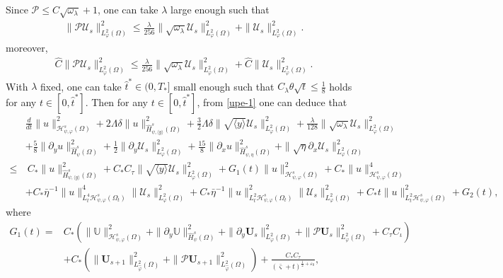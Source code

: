 \documentclass{amsart}
\numberwithin{equation}{section}
\newcommand\y{{{\langle y \rangle}}}
\begin{document}
Since $\mathcal{P}\leq C\sqrt{\omega_{\lambda}}+1$, one can take $\lambda$ large enough such that
\begin{align}\label{pusc}
\|\mathcal{P}\mathcal{U}_{s}\|_{L_{\varphi}^{2}(\Omega)}^{2}
\leq \frac{\lambda}{256}\|\sqrt{\omega_{\lambda}}\mathcal{U}_{s}\|_{L_{\varphi}^{2}(\Omega)}^{2}
    +\|\mathcal{U}_{s}\|_{L_{\varphi}^{2}(\Omega)}^{2}.
\end{align}
moreover,
\begin{align*}
\hat{C}\|\mathcal{P}\mathcal{U}_{s}\|_{L_{\varphi}^{2}(\Omega)}^{2}
\leq \frac{\lambda}{256}\|\sqrt{\omega_{\lambda}}\mathcal{U}_{s}\|_{L_{\varphi}^{2}(\Omega)}^{2}
    +\hat{C}\|\mathcal{U}_{s}\|_{L_{\varphi}^{2}(\Omega)}^{2}.
\end{align*}
With $\lambda$ fixed, one can take $\hat{t}^{*}\in(0,T_{*}]$ small enough such that $C_{\lambda}\theta\sqrt{t}\leq\frac{1}{8}$ holds for any $t\in[0,\hat{t}^{*}]$.
Then for any $t\in[0,\hat{t}^{*}]$, from \eqref{upe-1} one can deduce that
\begin{align}\label{upe-2}
& \frac{d}{dt}\|u\|_{\mathcal{H}_{\psi,\varphi}^{s}(\Omega)}^{2}
 +2\Lambda\delta\|u\|_{\hat{H}_{\psi,\y}^{s}(\Omega)}^{2}
 +\frac{3}{2}\Lambda\delta\|\sqrt{\y}\mathcal{U}_{s}\|_{L_{\varphi}^{2}(\Omega)}^{2}
 +\frac{\lambda}{128}\|\sqrt{\omega_{\lambda}}\mathcal{U}_{s}\|_{L_{\varphi}^{2}(\Omega)}^{2}\\
&+\frac{5}{8}\|\partial_{y}u\|_{\hat{H}_{\psi}^{s}(\Omega)}^{2}
 +\frac{1}{2}\|\partial_{y}\mathcal{U}_{s}\|_{L_{\varphi}^{2}(\Omega)}^{2}
 +\frac{15}{8}\|\partial_{x}u\|_{\hat{H}_{\psi,\eta}^{s}(\Omega)}^{2}
 +\|\sqrt{\eta}\partial_{x}\mathcal{U}_{s}\|_{L_{\varphi}^{2}(\Omega)}^{2}\nonumber\\
\leq&~C_{*}\|u\|_{\hat{H}_{\psi,\y}^{s}(\Omega)}^{2}
     +C_{*}C_{\tau}\|\sqrt{\y}\mathcal{U}_{s}\|_{L_{\varphi}^{2}(\Omega)}^{2}
     +G_{1}(t)\|u\|_{\mathcal{H}_{\psi,\varphi}^{s}(\Omega)}^{2}
     +C_{*}\|u\|_{\mathcal{H}_{\psi,\varphi}^{s}(\Omega)}^{4}\nonumber\\
    &+C_{*}\bar{\eta}^{-1}\|u\|_{L_{t}^{4}\mathcal{H}_{\psi,\varphi}^{s}(\Omega_{t})}^{4}\|\mathcal{U}_{s}\|_{L_{\varphi}^{2}(\Omega)}^{2}
     +C_{*}\bar{\eta}^{-1}\|u\|_{L_{t}^{2}\mathcal{H}_{\psi,\varphi}^{s}(\Omega_{t})}^{2}\|\mathcal{U}_{s}\|_{L_{\varphi}^{2}(\Omega)}^{2}
     +C_{*}t\|u\|_{L_{t}^{2}\mathcal{H}_{\psi,\varphi}^{s}(\Omega)}^{2}
     +G_{2}(t)\nonumber,
\end{align}
where
\begin{align*}
G_{1}(t)
=& C_{*}\left(\|\mathbb{U}\|_{\mathcal{H}_{\psi,\varphi}^{s}(\Omega)}^{2}
                +\|\partial_{y}\mathbb{U}\|_{\hat{H}_{\psi}^{s}(\Omega)}^{2}
                +\|\partial_{y}\mathbf{U}_{s}\|_{L_{\varphi}^{2}(\Omega)}^{2}
                +\|\mathcal{P}\mathbf{U}_{s}\|_{L_{\varphi}^{2}(\Omega)}^{2}
                +C_{\tau}C_{\iota}\right)\\
 &+C_{*}\left(\|\mathbf{U}_{s+1}\|_{L_{\hat{\varphi}}^{2}(\Omega)}^{2}+\|\mathcal{P}\mathbf{U}_{s+1}\|_{L_{\hat{\varphi}}^{2}(\Omega)}^{2}\right)
  +\frac{C_{*}C_{\tau}}{(\bar{\varsigma}+t)^{\frac{1}{2}+\varepsilon_{0}}},
\end{align*}
\end{document}
